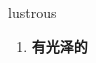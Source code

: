 
\begin{frame}
{\huge lustrous}
\begin{center}
\begin{enumerate}\Large
  \item \textbf{有光泽的}
\end{enumerate}
\end{center}
\end{frame}
